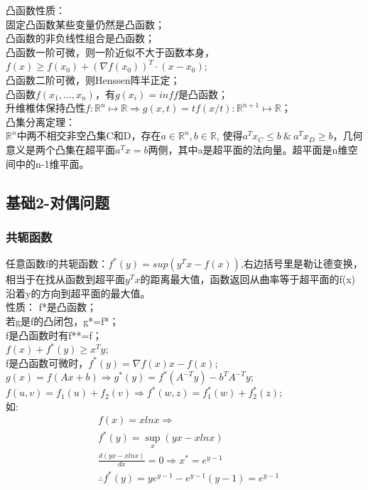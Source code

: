 \documentclass[UTF8]{../computerUniverse}
\begin{document}
凸函数性质：\\
固定凸函数某些变量仍然是凸函数；\\
凸函数的非负线性组合是凸函数；\\ 
凸函数一阶可微，则一阶近似不大于函数本身，
$f(x)\geqslant f(x_0)+\left( \nabla f(x_0) \right)^T \cdot (x-x_0)$;\\
凸函数二阶可微，则Henssen阵半正定；\\
凸函数$f(x_1,...,x_n)$，有$g(x_i)=inf f$是凸函数；\\
升维椎体保持凸性$f:\mathbb{R}^n \mapsto \mathbb{R} \Rightarrow 
g(x,t)=tf(x/t): \mathbb{R}^{n+1} \mapsto \mathbb{R} $；\\

凸集分离定理：\\
$\mathbb{{R}}^n$中两不相交非空凸集C和D，存在$a \in \mathbb{R}^n, b \in \mathbb{R}$, 使得$a^Tx_C \leqslant b\ \&\ a^Tx_D \geqslant b$，几何意义是两个凸集在超平面$a^Tx=b$两侧，其中a是超平面的法向量。超平面是n维空间中的n-1维平面。\\

\subsection{基础2-对偶问题}
\subsubsection{共轭函数}
任意函数f的共轭函数：$f^*(y)=sup(y^Tx-f(x))$,右边括号里是勒让德变换，相当于在找从函数到超平面$y^Tx$的距离最大值，函数返回从曲率等于超平面的f(x)沿着y的方向到超平面的最大值。\\
性质：
f*是凸函数；\\
若g是f的凸闭包，g*=f*；\\
f是凸函数时有f**=f；\\
$f(x)+f^*(y)\geqslant x^Ty$;\\
f是凸函数可微时，$f^*(y)=\nabla f(x)x-f(x)$;\\
$g(x)=f(Ax+b)\Rightarrow g^*(y)=f^*(A^{-T}y)-b^TA^{-T}y$;\\
$f(u,v)=f_1(u)+f_2(v)\Rightarrow f^*(w,z)=f_1^*(w)+f_2^*(z)$;\\
如:
\begin{equation}
    \begin{split}
    &f(x)=xlnx \Rightarrow \\
&f^*(y)=\sup_x(yx-xlnx)\\
&\frac{d(yx-xlnx)}{dx}=0\Rightarrow x^*=e^{y-1}\\
&\therefore f^*(y)=ye^{y-1}-e^{y-1}(y-1)=e^{y-1}
    \end{split}
\end{equation}
\end{document}
